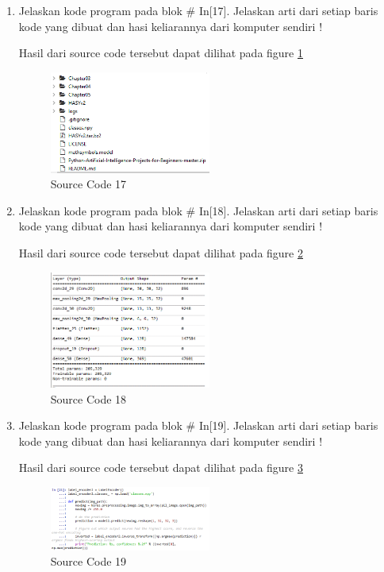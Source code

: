 \begin{enumerate}
\item Jelaskan kode program pada blok \# In[17]. Jelaskan arti dari setiap baris kode yang dibuat dan hasi keliarannya dari komputer sendiri !
	
	\subitem Hasil dari source code tersebut dapat dilihat pada figure \ref{YNC7-25}
	\begin{figure}[!htbp!]
		\centerline{\includegraphics[width=0.5\textwidth]{figures/YN/Chapter7/YNC7-25.png}}
		\caption{Source Code 17}
		\label{YNC7-25}
	\end{figure}

\item Jelaskan kode program pada blok \# In[18]. Jelaskan arti dari setiap baris kode yang dibuat dan hasi keliarannya dari komputer sendiri !
	
	\subitem Hasil dari source code tersebut dapat dilihat pada figure \ref{YNC7-26}
	\begin{figure}[!htbp!]
		\centerline{\includegraphics[width=0.5\textwidth]{figures/YN/Chapter7/YNC7-26.png}}
		\caption{Source Code 18}
		\label{YNC7-26}
	\end{figure}

\item Jelaskan kode program pada blok \# In[19]. Jelaskan arti dari setiap baris kode yang dibuat dan hasi keliarannya dari komputer sendiri !
	
	\subitem Hasil dari source code tersebut dapat dilihat pada figure \ref{YNC7-27}
	\begin{figure}[!htbp!]
		\centerline{\includegraphics[width=0.5\textwidth]{figures/YN/Chapter7/YNC7-27.png}}
		\caption{Source Code 19}
		\label{YNC7-27}
	\end{figure}


\end{enumerate}
